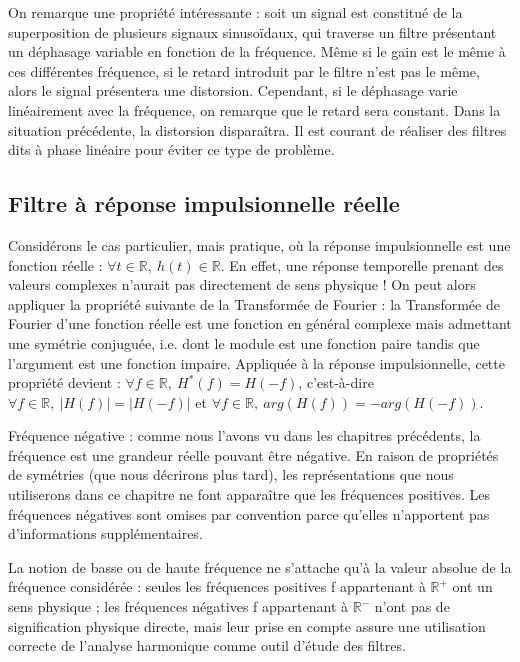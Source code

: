 \documentclass[]{book}
\begin{document}
{	On remarque une propriété intéressante : soit un signal est constitué de la superposition de plusieurs signaux sinusoïdaux, qui traverse un filtre présentant un déphasage variable en fonction de la fréquence. Même si le gain est le même à ces différentes fréquence, si le retard introduit par le filtre n'est pas le même, alors le signal présentera une distorsion.
	Cependant, si le déphasage varie linéairement avec la fréquence, on remarque que le retard sera constant. Dans la situation précédente, la distorsion disparaîtra. Il est courant de réaliser des filtres dits à phase linéaire pour éviter ce type de problème.
	
	\subsection{Filtre à réponse impulsionnelle réelle}
	Considérons le cas particulier, mais pratique, où la réponse impulsionnelle est une fonction réelle : $ \forall t \in \mathbb{R},~h(t) \in \mathbb{R}$. En effet, une réponse temporelle prenant des valeurs complexes n’aurait pas directement de sens physique ! On peut alors appliquer la propriété suivante de la Transformée de Fourier : la Transformée de Fourier d’une fonction réelle est une fonction en général complexe mais admettant une symétrie conjuguée, i.e. dont le module est une fonction paire tandis que l’argument est une fonction impaire. Appliquée à la réponse impulsionnelle, cette propriété devient : $\forall f \in \mathbb{R},~H^{*}(f) = H(-f)$, c'est-à-dire $\forall f \in \mathbb{R},~|H(f)| = |H(-f)|$ et $\forall f \in \mathbb{R},~arg(H(f)) = -arg(H(-f))$.
	
	Fréquence négative : comme nous l'avons vu dans les chapitres précédents, la fréquence est une grandeur réelle pouvant être négative. En raison de propriétés de symétries (que nous décrirons plus tard), les représentations que nous utiliserons dans ce chapitre ne font apparaître que les fréquences positives. Les fréquences négatives sont omises par convention parce qu'elles n'apportent pas d'informations supplémentaires.
	
	La notion de basse ou de haute fréquence ne s’attache qu’à la valeur absolue de la fréquence considérée : seules les fréquences positives f appartenant à $\mathbb{R}^{+}$ ont un sens physique ; les fréquences négatives f appartenant à $\mathbb{R}^{-}$ n’ont pas de signification physique directe, mais leur prise en compte assure une utilisation correcte de l’analyse harmonique comme outil d’étude des filtres.
	
}
\end{document}
